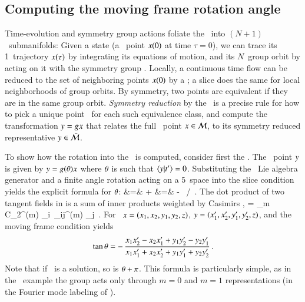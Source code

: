 \subsection{Computing the moving frame rotation angle}
\label{exam:CLErotAngle}

Time-evolution and symmetry group actions foliate the \statesp\ into
$(N\!+\!1)$\dmn\ submanifolds: Given a state (a \statesp\ point $x(0)$
at time $\tau=0$), we can trace its  1\dmn\ trajectory $x(\tau)$ by
integrating its equations of motion, and its $N$\dmn\ group orbit by
acting on it with the symmetry group \Group. Locally, a continuous time
flow can be reduced to the set of neighboring points $x(0)$ by a
\PoincSec; a slice does the same for local neighborhoods of group orbits.
By symmetry, two points are equivalent if they are in the same group
orbit. {\em Symmetry reduction} by the \mframes\ is a precise rule for
how to pick a unique point \sspRed\ for each such equivalence class, and
compute the transformation $y =g x$ that relates the full
\statesp\ point  $x \in {\cal M}$, to its symmetry reduced representative
$y \in \bar{\cal M}$.

To show how the rotation into the \slice\ is computed, consider first the
\cLe. The \reducedsp\ point $y$ is given by
$y=g({\bf \theta}) x$ where ${\bf \theta}$ is such that
$\braket{\sspRed}{\sliceTan{}}=0$. Substituting the \ Lie algebra
generator and a finite angle  rotation  acting on a
5\dmn\ space  into the slice condition 
yields the explicit formula for ${\bf \theta}$:
 &=&
    \braket{\ssp}{\sliceTan{}}\cos\gSpace
    +\braket{\groupTan_{}(\ssp)}{\sliceTan{}} \sin\gSpace
	\continue %
\tan\gSpace &=&
   - \, {\braket{\ssp}{\sliceTan{}}}/
          {\braket{\groupTan_{}(\ssp)}{\sliceTan{}}}
\,.
\label{SL:CLEsliceRot}
\eea
The dot product of two tangent fields in  is a
sum of inner products weighted by Casimirs ,
\beq
\braket{\groupTan(\sspRed)}{\groupTan(\slicep)}
   = \sum_m C_2^{(m)} {\sspRed}_i\, \delta_{ij}^{(m)} \slicep_j
\,.
For \cLe\
$\ssp = (x_1,x_2,y_1,y_2,z)$,
$\sspRed = (x_1',x_2',y_1',y_2',z)$,
and the moving frame condition  yields
\[
\tan\gSpace =
- \, \frac{x_1 x_2'-x_2 x_1'+y_1 y_2' -y_2 y_1'}
       {x_1 x'_1+x_2 x'_2+y_1 y'_1+y_2 y'_2}
\,.
\]
Note that if \gSpace\ is a solution, so is ${\bf \theta}+\pi$.
This formula is particularly simple, as in the \cLe\
example the group acts only through $m=0$ and $m=1$ representations
(in the Fourier mode labeling of ).

